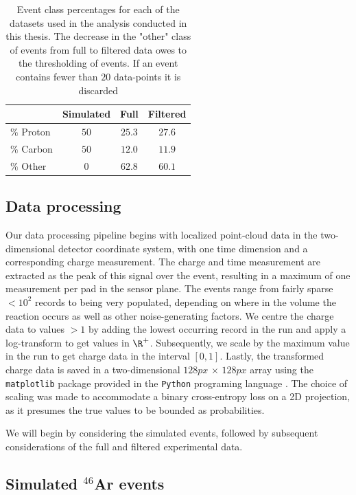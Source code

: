 \begin{table}
\centering
\caption{Event class percentages for each of the datasets used in the analysis conducted in this thesis. The decrease in the "other" class of events from full to filtered data owes to the thresholding of events. If an event contains fewer than $20$ data-points it is discarded}\label{tab:class_distr}
\begin{tabular}{lccc}
\toprule
{} & Simulated & Full & Filtered \\
\midrule
$\%$ Proton & $50$ & $25.3$ & $27.6$ \\ 
$\%$ Carbon & $50$ & $12.0$ & $11.9$ \\
$\%$ Other & $0$ & $62.8$ & $60.1$ \\
\end{tabular}
\end{table}

\subsection{Data processing}

Our data processing pipeline begins with localized point-cloud data in the two-dimensional detector coordinate system, with one time dimension and a corresponding charge measurement. The charge and time measurement are extracted as the peak of this signal over the event, resulting in a maximum of one measurement per pad in the sensor plane. The events range from fairly sparse $< 10^2$ records to being very populated, depending on where in the volume the reaction occurs as well as other noise-generating factors. We centre the charge data to values $>1$ by adding the lowest occurring record in the run and apply a log-transform to get values in $\R^+$. Subsequently, we scale by the maximum value in the run to get charge data in the interval $[0, 1]$. Lastly, the transformed charge data is saved in a two-dimensional $128px\, \times \,128px$ array using the \lstinline{matplotlib} package provided in the \lstinline{Python} programing language \cite{matplotlib}. The choice of scaling was made to accommodate a binary cross-entropy loss on a 2D projection, as it presumes the true values to be bounded as probabilities.

We will begin by considering the simulated events, followed by subsequent considerations of the full and filtered experimental data.

\subsection{Simulated \texorpdfstring{${}^{46}$Ar}{46Ar}  events}\label{sec:data_sim}

